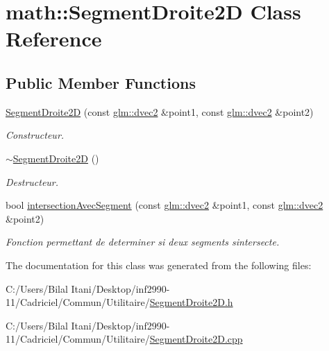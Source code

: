 \hypertarget{classmath_1_1_segment_droite2_d}{}\section{math\+:\+:Segment\+Droite2D Class Reference}
\label{classmath_1_1_segment_droite2_d}
\subsection*{Public Member Functions}
\begin{DoxyCompactItemize}
\item 
\hyperlink{group__inf2990_ga2c78660745180150591d3965fa7f42e7}{Segment\+Droite2D} (const \hyperlink{group__core__types_gae6727259898288cae197724d5f172b3b}{glm\+::dvec2} \&point1, const \hyperlink{group__core__types_gae6727259898288cae197724d5f172b3b}{glm\+::dvec2} \&point2)
\begin{DoxyCompactList}\small\item\em Constructeur. \end{DoxyCompactList}\item 
\hyperlink{group__inf2990_ga43a27782519b8fa8a65341f696c2386c}{$\sim$\+Segment\+Droite2D} ()
\begin{DoxyCompactList}\small\item\em Destructeur. \end{DoxyCompactList}\item 
bool \hyperlink{group__inf2990_gaba564de77b288f588aa6cd7bb28f7860}{intersection\+Avec\+Segment} (const \hyperlink{group__core__types_gae6727259898288cae197724d5f172b3b}{glm\+::dvec2} \&point1, const \hyperlink{group__core__types_gae6727259898288cae197724d5f172b3b}{glm\+::dvec2} \&point2)
\begin{DoxyCompactList}\small\item\em Fonction permettant de determiner si deux segments s\textquotesingle{}intersecte. \end{DoxyCompactList}\end{DoxyCompactItemize}


The documentation for this class was generated from the following files\+:\begin{DoxyCompactItemize}
\item 
C\+:/\+Users/\+Bilal Itani/\+Desktop/inf2990-\/11/\+Cadriciel/\+Commun/\+Utilitaire/\hyperlink{_segment_droite2_d_8h}{Segment\+Droite2\+D.\+h}\item 
C\+:/\+Users/\+Bilal Itani/\+Desktop/inf2990-\/11/\+Cadriciel/\+Commun/\+Utilitaire/\hyperlink{_segment_droite2_d_8cpp}{Segment\+Droite2\+D.\+cpp}\end{DoxyCompactItemize}
